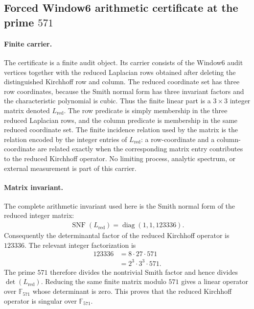 
\subsection{Forced Window6 arithmetic certificate at the prime $571$}
\label{subsec:f-a2-window6-modpstar-571-spectral-collision-certificate}

\paragraph{Finite carrier.}
The certificate is a finite audit object. Its carrier consists of the Window6 audit vertices together with the reduced Laplacian rows obtained after deleting the distinguished Kirchhoff row and column. The reduced coordinate set has three row coordinates, because the Smith normal form has three invariant factors and the characteristic polynomial is cubic. Thus the finite linear part is a $3 \times 3$ integer matrix denoted $L_{\mathrm{red}}$. The row predicate is simply membership in the three reduced Laplacian rows, and the column predicate is membership in the same reduced coordinate set. The finite incidence relation used by the matrix is the relation encoded by the integer entries of $L_{\mathrm{red}}$: a row-coordinate and a column-coordinate are related exactly when the corresponding matrix entry contributes to the reduced Kirchhoff operator. No limiting process, analytic spectrum, or external measurement is part of this carrier.

\paragraph{Matrix invariant.}
The complete arithmetic invariant used here is the Smith normal form of the reduced integer matrix:
$$
\begin{aligned}
\operatorname{SNF}(L_{\mathrm{red}}) = \operatorname{diag}(1,1,123336).
\end{aligned}
$$
Consequently the determinantal factor of the reduced Kirchhoff operator is $123336$. The relevant integer factorization is
$$
\begin{aligned}
123336 &= 8 \cdot 27 \cdot 571 \\
       &= 2^3 \cdot 3^3 \cdot 571.
\end{aligned}
$$
The prime $571$ therefore divides the nontrivial Smith factor and hence divides $\det(L_{\mathrm{red}})$. Reducing the same finite matrix modulo $571$ gives a linear operator over $\mathbb{F}_{571}$ whose determinant is zero. This proves that the reduced Kirchhoff operator is singular over $\mathbb{F}_{571}$.

